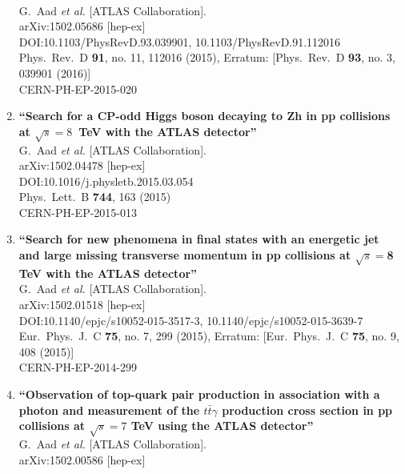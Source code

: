 \documentclass{article}
\begin{document}
\begin{enumerate}
  \\{}G.~Aad {\it et al.} [ATLAS Collaboration].
  \\{}arXiv:1502.05686 [hep-ex]
  \\{}DOI:10.1103/PhysRevD.93.039901, 10.1103/PhysRevD.91.112016
  \\{}Phys.\ Rev.\ D {\bf 91}, no. 11, 112016 (2015), Erratum: [Phys.\ Rev.\ D {\bf 93}, no. 3, 039901 (2016)]
  \\{}CERN-PH-EP-2015-020
\item%
{\bf ``Search for a CP-odd Higgs boson decaying to Zh in pp collisions at $\sqrt{s} = 8$ TeV with the ATLAS detector''}
  \\{}G.~Aad {\it et al.} [ATLAS Collaboration].
  \\{}arXiv:1502.04478 [hep-ex]
  \\{}DOI:10.1016/j.physletb.2015.03.054
  \\{}Phys.\ Lett.\ B {\bf 744}, 163 (2015)
  \\{}CERN-PH-EP-2015-013
\item%
{\bf ``Search for new phenomena in final states with an energetic jet and large missing transverse momentum in pp collisions at $\sqrt{s}=$8 TeV with the ATLAS detector''}
  \\{}G.~Aad {\it et al.} [ATLAS Collaboration].
  \\{}arXiv:1502.01518 [hep-ex]
  \\{}DOI:10.1140/epjc/s10052-015-3517-3, 10.1140/epjc/s10052-015-3639-7
  \\{}Eur.\ Phys.\ J.\ C {\bf 75}, no. 7, 299 (2015), Erratum: [Eur.\ Phys.\ J.\ C {\bf 75}, no. 9, 408 (2015)]
  \\{}CERN-PH-EP-2014-299
\item%
{\bf ``Observation of top-quark pair production in association with a photon and measurement of the $t\bar{t}\gamma$ production cross section in pp collisions at $\sqrt{s}=7$ TeV using the ATLAS detector''}
  \\{}G.~Aad {\it et al.} [ATLAS Collaboration].
  \\{}arXiv:1502.00586 [hep-ex]

\end{enumerate}
\end{document}
